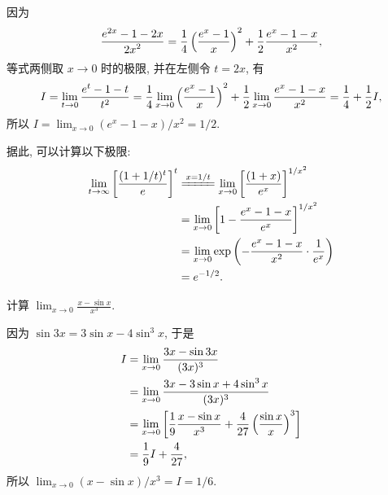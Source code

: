 \begin{solution}
    因为
    \[
        \frac{e^{2x} - 1 - 2x}{{2x}^2} = \frac 14 \del[2]{\frac{e^x - 1 }{x}}^2
        + \frac 12 \frac{e^x - 1 - x}{x^2},
    \]
    等式两侧取 $x \to 0$ 时的极限, 并在左侧令 $t = 2x$, 有
    \[
        I
        = \lim_{t \to 0} \frac{e^t - 1 - t}{t^2}
        = \frac 14 \lim_{x \to 0} \del[2]{\frac{e^x - 1 }{x}}^2
        + \frac 12 \lim_{x \to 0} \frac{e^x - 1 - x}{x^2}
        = \frac 14 + \frac 12 I,
    \]
    所以 $I = \lim_{x \to 0} (e^x - 1 - x)/x^2 = 1/2$.
    
    据此, 可以计算以下极限:
    \begin{align*}
        \lim_{t \to \infty} \sbr[3]{\frac{(1 + 1/t)^t}{e}}^t
        &\xlongequal{x = 1/t} \lim_{x \to 0} \sbr[3]{\frac{(1 + x)}{e^x}}^{1/x^2} \\
        &= \lim_{x \to 0} \sbr[3]{1 - \frac{e^x - 1 - x}{e^x}}^{1/x^2} \\
        &= \lim_{x \to 0} \exp\del[3]{-\frac{e^x - 1 - x}{x^2} \cdot \frac{1}{e^x}} \\
        &= e^{-1/2}.
    \end{align*}
\end{solution}

\begin{exercise}[常用极限] \label{xiti:sinx-1}
    计算 $\displaystyle \lim_{x \to 0} \frac{x - \sin x}{x^3}$.
\end{exercise}

\begin{solution}
    因为 $\sin 3x = 3 \sin x - 4 \sin^3 x$, 于是
    \begin{align*}
        I
        &= \lim_{x \to 0} \frac{3x - \sin 3x}{(3x)^3} \\
        &= \lim_{x \to 0} \frac{3x - 3 \sin x + 4 \sin^3 x}{(3x)^3} \\
        &= \lim_{x \to 0} \sbr[3]{\frac 19 \frac{x - \sin x}{x^3}
            + \frac{4}{27} \del[2]{\frac{\sin x}{x}}^3} \\
        &= \frac 19 I + \frac{4}{27},
    \end{align*}
    所以 $\lim_{x \to 0} (x - \sin x) / x^3 = I = 1/6$.
\end{solution}



